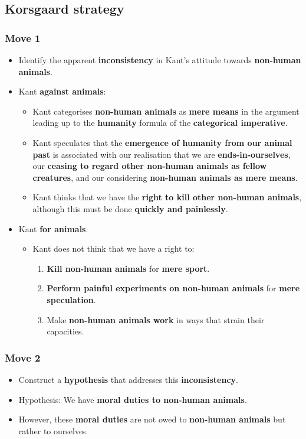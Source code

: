 \documentclass[11pt]{article}
\begin{document}
\subsection{Korsgaard strategy}
\label{sec:orgd2be60e}

\subsubsection{Move 1}
\label{sec:org29bde31}
\begin{itemize}
\item Identify the apparent \textbf{inconsistency} in Kant's attitude towards \textbf{non-human animals}.
\item Kant \textbf{against animals}:
\begin{itemize}
\item Kant categorises \textbf{non-human animals} as \textbf{mere means} in the argument leading up to the \textbf{humanity} formula of the \textbf{categorical imperative}.
\item Kant speculates that the \textbf{emergence of humanity from our animal past} is associated with our realisation that we are \textbf{ends-in-ourselves}, our \textbf{ceasing to regard other non-human animals as fellow creatures}, and our considering \textbf{non-human animals as mere means}.
\item Kant thinks that we have the \textbf{right to kill other non-human animals}, although this must be done \textbf{quickly and painlessly}.
\end{itemize}
\item Kant \textbf{for animals}:
\begin{itemize}
\item Kant does not think that we have a right to:
\begin{enumerate}
\item \textbf{Kill non-human animals} for \textbf{mere sport}.
\item \textbf{Perform painful experiments on non-human animals} for \textbf{mere speculation}.
\item Make \textbf{non-human animals work} in ways that strain their capacities.
\end{enumerate}
\end{itemize}
\end{itemize}
\subsubsection{Move 2}
\label{sec:orga8716a1}
\begin{itemize}
\item Construct a \textbf{hypothesis} that addresses this \textbf{inconsistency}.
\item Hypothesis: We have \textbf{moral duties to non-human animals}.
\item However, these \textbf{moral duties} are not owed to \textbf{non-human animals} but rather to ourselves.
\end{itemize}
\end{document}
